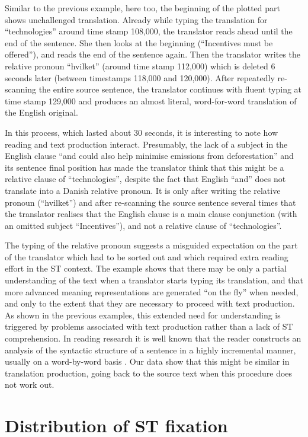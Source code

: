 \documentclass[output=paper]{LSP/langsci}
\begin{document}
Similar to the previous example, here too, the beginning of the plotted part shows unchallenged translation. Already while typing the translation for ``technologies'' around time stamp 108,000, the translator reads ahead until the end of the sentence. She then looks at the beginning (``Incentives must be offered''), and reads the end of the sentence again. Then the translator writes the relative pronoun ``hvilket'' (around time stamp 112,000) which is deleted 6 seconds later (between timestamps 118,000 and 120,000). After repeatedly re-scanning the entire source sentence, the translator continues with fluent typing at time stamp 129,000 and produces an almost literal, word-for-word translation of the English original. 

In this process, which lasted about 30 seconds, it is interesting to note how reading and text production interact. Presumably, the lack of a subject in the English clause ``and could also help minimise emissions from deforestation'' and its sentence final position has made the translator think that this might be a relative clause of ``technologies'', despite the fact that English ``and'' does not translate into a Danish relative pronoun. It is only after writing the relative pronoun (``hvilket'') and after re-scanning the source sentence several times that the translator realises that the English clause is a main clause conjunction (with an omitted subject ``Incentives''), and not a relative clause of ``technologies''.

The typing of the relative pronoun suggests a misguided expectation on the part of the translator which had to be sorted out and which required extra reading effort in the ST context. The example shows that there may be only a partial understanding of the text when a translator starts typing its translation, and that more advanced meaning representations are generated ``on the fly'' when needed, and only to the extent that they are necessary to proceed with text production. As shown in the previous examples, this extended need for understanding is triggered by problems associated with text production rather than a lack of ST comprehension.  In reading research it is well known that the reader constructs an analysis of the syntactic structure of a sentence in a highly incremental manner, usually on a word-by-word basis \citep{Staub2007}. Our data show that this might be similar in translation production, going back to the source text when this procedure does not work out. 

\section{Distribution of ST fixation}\label{sec:carl:5}
\end{document}
